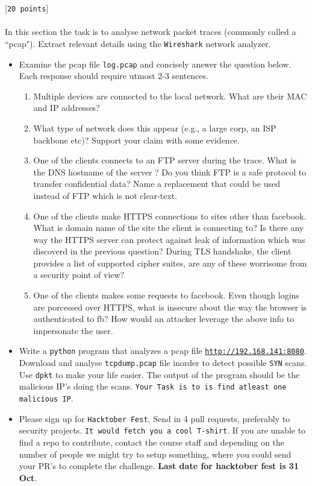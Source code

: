 \documentclass[11pt]{article}
\begin{document}
 [\texttt{20 points}] \\\\
In this section the task is to analyse network packet traces (commonly called a ``pcap"). Extract relevant details using the \texttt{Wireshark} 
network analyzer.

\begin{itemize}
	\item {
			Examine the pcap file \texttt{log.pcap} and concisely answer the question below. Each response should require utmost 2-3 sentences.
			\begin{enumerate}
				\item Multiple devices are connected to the local network. What are their MAC and IP addresses?
				\item What type of network does this appear (e.g., a large corp, an ISP backbone etc)? Support your claim with some evidence.
				\item One of the clients connects to an FTP server during the trace. What is the DNS hostname of the server ? Do you think FTP is a
					safe protocol to transfer confidential data? Name a replacement that could be used instead of FTP which is not clear-text.
				\item One of the clients make HTTPS connections to sites other than facebook. What is domain name of the site the client is connecting to?
					Is there any way the HTTPS server can protect against leak of information which was discoverd in the previous question?
					During TLS handshake, the client provides a list of supported cipher suites, are any of these worrisome from a security point of view?
				\item One of the clients makes some requests to facebook. Even though logins are porcessed over HTTPS, what is insecure about the way the browser is authenticated to fb? How would an attacker leverage the above info to impersonate the user. 
			\end{enumerate}
		}
	\item {
			Write a \texttt{python} program that analyzes a pcap file   \href{http://192.168.1.41:8080/}{\texttt{http://192.168.141:8080}}. Download and analyse \texttt{tcpdump.pcap} file inorder to detect possible \texttt{SYN} scans. Use \texttt{dpkt} to make your life easier.
			The output of the program should be the malicious IP's doing the scans. \texttt{Your Task is to is find atleast one malicious IP}.
			}
		\item {
				Please sign up for \texttt{Hacktober Fest}. Send in 4 pull requests, preferably to security projects. \texttt{It would fetch you a cool T-shirt}. If you are unable to find a repo to contribute, contact the course staff and depending on the number of people we might try to setup something, where you could send your PR's to complete the challenge. \textbf{Last date for hacktober fest is 31 Oct}.
				}
\end{itemize}
\end{document}
